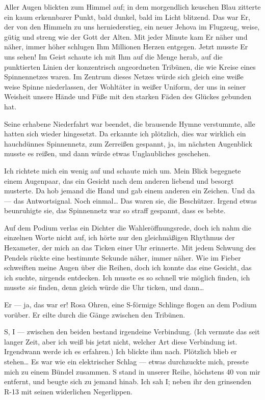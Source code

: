 Aller Augen blickten zum Himmel auf; in dem
morgendlich keuschen Blau zitterte ein kaum erkennbarer Punkt, bald
dunkel, bald im Licht blitzend. Das war Er, der von den Himmeln zu
uns herniederstieg, ein neuer Jehova im Flugzeug, weise, gütig und
streng wie der Gott der Alten. Mit jeder Minute kam Er näher und
näher, immer höher schlugen Ihm Millionen Herzen entgegen. Jetzt
musste Er uns sehen! Im Geist schaute ich mit Ihm auf die Menge
herab, auf die punktierten Linien der konzentrisch angeordneten
Tribünen, die wie Kreise eines Spinnennetzes waren. Im Zentrum
dieses Netzes würde sich gleich eine
weiße weise Spinne niederlassen, der Wohltäter in weißer Uniform,
der uns in seiner Weisheit unsere Hände und Füße mit den starken
Fäden des Glückes gebunden hat.

Seine erhabene Niederfahrt war
beendet, die brausende Hymne verstummte, alle hatten sich wieder
hingesetzt. Da erkannte ich plötzlich, dies war wirklich ein
hauchdünnes Spinnennetz, zum Zerreißen gespannt, ja, im nächsten
Augenblick musste es reißen, und dann würde etwas Unglaubliches
geschehen.

Ich richtete mich ein wenig auf und schaute mich um. Mein Blick
begegnete einem Augenpaar, das ein Gesicht nach dem anderen liebend
und besorgt musterte. Da hob jemand die Hand und gab einem anderen
ein Zeichen. Und da — das Antwortsignal. Noch einmal\ldots{} Das waren
sie, die Beschützer. Irgend etwas beunruhigte sie, das Spinnennetz
war so straff gespannt, dass es bebte.

Auf dem Podium verlas ein
Dichter die Wahleröffnungsrede, doch ich nahm die einzelnen Worte
nicht auf, ich hörte nur den gleichmäßigen Rhythmus der Hexameter,
der mich an das Ticken einer Uhr erinnerte. Mit jedem Schwung des
Pendels rückte eine bestimmte Sekunde näher, immer näher. Wie im
Fieber schweiften meine Augen über die Reihen, doch ich konnte das
eine Gesicht, das ich suchte, nirgends entdecken. Ich musste es so
schnell wie möglich finden, ich musste \emph{sie} finden, denn gleich
würde die Uhr ticken, und dann\ldots{}

Er — ja, das war er! Rosa Ohren, eine S-förmige Schlinge flogen an
dem Podium vorüber. Er eilte durch die Gänge zwischen den
Tribünen.

S, I — zwischen den beiden bestand irgendeine Verbindung. (Ich
vermute das seit langer Zeit, aber ich weiß bis jetzt nicht,
welcher Art diese Verbindung ist. Irgendwann werde ich es
erfahren.) Ich blickte ihm nach. Plötzlich
blieb er stehen\ldots{} Es war wie ein elektrischer Schlag — etwas
durchzuckte mich, presste mich zu einem Bündel zusammen. S stand in
unserer Reihe, höchstens 40\textdegree{} von mir entfernt, und beugte sich zu
jemand hinab. Ich sah I; neben ihr den grinsenden R-13 mit seinen
widerlichen Negerlippen.

